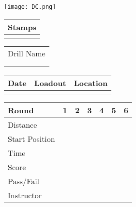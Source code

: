 \documentclass[../Cover.tex]{subfiles}
\begin{document}
\begin{minipage}[t]{2cm} 
	\texttt{[image: DC.png]}
	\begin{tabular}{p{1.5cm}|}
		Stamps \\
		\hline
		\\[5.5cm]
	\end{tabular}
\end{minipage}
\hfill
\begin{minipage}[t]{11cm}
	\begin{minipage}[t]{3cm}
		\begin{tabular}{ p{3cm} }			
			\large Drill Name\\[0.5cm]
			\\
			\hline
			\\	
		\end{tabular}
	\end{minipage}
	\hfill
	\begin{minipage}[t]{7cm}
		\begin{tabular}{ | p{1.5cm} | p{1.5cm} | p{1.5cm} |}
			\hline
			Date & Loadout & Location\\ 
			\hline
			&  &  \\ 
			\hline
		\end{tabular}
	\end{minipage}
	\begin{tabular}{ | p{1.5cm} | p{1cm} | p{1cm} | p{1cm} | p{1cm} | p{1cm} | p{1cm} |}
		\hline
		Round & 1 & 2 & 3 & 4 & 5 & 6 \\ 
		\hline
		\tiny Distance & & & & & & \\[0.5cm] 		
		\hline
		\tiny Start Position & & & & & & \\[0.5cm] 
		\hline
		\tiny Time & & & & & & \\[0.5cm] 
		\hline
		\tiny Score & & & & & & \\[0.5cm] 
		\hline
		\tiny Pass/Fail & & & & & & \\[0.5cm]
		\hline
		\tiny Instructor & & & & & & \\[0.5cm]
		\hline
	\end{tabular}
\end{minipage}
\end{document}
